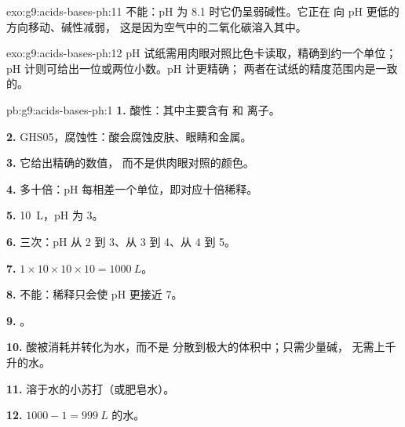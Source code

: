 \begin{solution}{exo:g9:acids-bases-ph:11}
不能：pH 为 8.1 时它仍呈弱碱性。它正在
向 pH 更低的方向移动、碱性减弱，
这是因为空气中的二氧化碳溶入其中。
\end{solution}

\begin{solution}{exo:g9:acids-bases-ph:12}
pH 试纸需用肉眼对照比色卡读取，精确到约一个单位；
pH 计则可给出一位或两位小数。pH 计更精确；
两者在试纸的精度范围内是一致的。
\end{solution}

\begin{solution}{pb:g9:acids-bases-ph:1}
\textbf{1.} 酸性：其中主要含有  和 
离子。

\textbf{2.} GHS05，腐蚀性：酸会腐蚀皮肤、眼睛和金属。

\textbf{3.} 它给出精确的数值，
而不是供肉眼对照的颜色。

\textbf{4.} 多十倍：pH 每相差一个单位，即对应十倍稀释。

\textbf{5.} \qty{10}{L}，pH 为 3。

\textbf{6.} 三次：pH 从 2 到 3、从 3 到 4、从 4 到 5。

\textbf{7.} $1 \times 10 \times 10 \times 10 = \qty{1000}{L}$。

\textbf{8.} 不能：稀释只会使 pH 更接近 7。

\textbf{9.} 。

\textbf{10.} 酸被消耗并转化为水，而不是
分散到极大的体积中；只需少量碱，
无需上千升的水。

\textbf{11.} 溶于水的小苏打（或肥皂水）。

\textbf{12.} $1000 - 1 = \qty{999}{L}$ 的水。
\end{solution}
